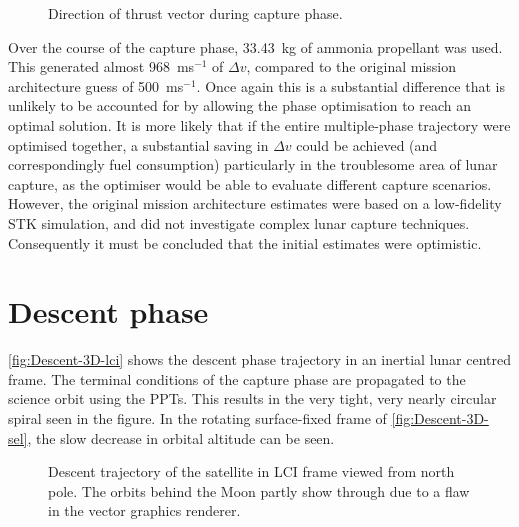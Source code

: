 \begin{figure}
\centering
\def\svgwidth{\figurewidth}

\caption{Direction of thrust vector during capture phase.} \label{fig:Capture-thrust}
\end{figure}

Over the course of the capture phase, 33.43~kg of ammonia propellant was used. This generated almost 968~ms$^{-1}$ of $\Delta v$, compared to the original mission architecture guess of 500~ms$^{-1}$. Once again this is a substantial difference that is unlikely to be accounted for by allowing the phase optimisation to reach an optimal solution. It is more likely that if the entire multiple-phase trajectory were optimised together, a substantial saving in $\Delta v$ could be achieved (and correspondingly fuel consumption) particularly in the troublesome area of lunar capture, as the optimiser would be able to evaluate different capture scenarios. However, the original mission architecture estimates were based on a low-fidelity STK simulation, and did not investigate complex lunar capture techniques. Consequently it must be concluded that the initial estimates were optimistic.



\clearpage


\section{Descent phase} \label{sec:Descent}

\autoref{fig:Descent-3D-lci} shows the descent phase trajectory in an inertial lunar centred frame. The terminal conditions of the capture phase are propagated to the science orbit using the PPTs. This results in the very tight, very nearly circular spiral seen in the figure.
In the rotating surface-fixed frame of \autoref{fig:Descent-3D-sel}, the slow decrease in orbital altitude can be seen.

\begin{figure}[h]
\centering
\def\svgwidth{\figurewidth}

\caption{Descent trajectory of the satellite in LCI frame viewed from north pole. The orbits behind the Moon partly show through due to a flaw in the vector graphics renderer.} \label{fig:Descent-3D-lci}
\end{figure}

